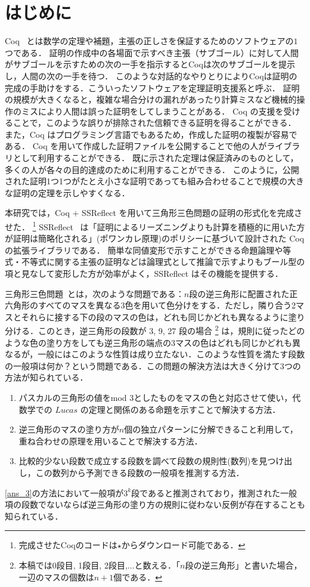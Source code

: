 \section{はじめに}
Coq~\cite{Coq} とは数学の定理や補題，主張の正しさを保証するためのソフトウェアの$1$つである．
証明の作成中の各場面で示すべき主張（サブゴール）に対して人間がサブゴールを示すための次の一手を指示するとCoqは次のサブゴールを提示し，人間の次の一手を待つ．
このような対話的なやりとりによりCoqは証明の完成の手助けをする．こういったソフトウェアを定理証明支援系と呼ぶ．
証明の規模が大きくなると，複雑な場合分けの漏れがあったり計算ミスなど機械的操作のミスにより人間は誤った証明をしてしまうことがある．
Coq の支援を受けることで，このような誤りが排除された信頼できる証明を得ることができる．
また，Coq はプログラミング言語でもあるため，作成した証明の複製が容易である．
Coq を用いて作成した証明ファイルを公開することで他の人がライブラリとして利用することができる．
既に示された定理は保証済みのものとして，多くの人が各々の目的達成のために利用することができる．
このように，公開された証明1つ1つがたとえ小さな証明であっても組み合わせることで規模の大きな証明の定理を示しやすくなる．

本研究では，Coq + SSReflect を用いて三角形三色問題の証明の形式化を完成させた．
\footnote{
  完成させたCoqのコードは$\star$からダウンロード可能である．
}
SSReflect~\cite{SSReflect,CoqBook} は「証明によるリーズニングよりも計算を積極的に用いた方が証明は簡略化される」(ポワンカレ原理)のポリシーに基づいて設計された Coq の拡張ライブラリである．
簡単な同値変形で示すことができる命題論理や等式・不等式に関する主張の証明などは論理式として推論で示すよりもブール型の項と見なして変形した方が効率がよく，SSReflect はその機能を提供する．

三角形三色問題~\cite{Nishiyama1,Nishiyama2,Nishiyama3}とは，次のような問題である：$n$段の逆三角形に配置された正六角形のすべてのマスを異なる3色を用いて色分けをする．ただし，隣り合う2マスとそれらに接する下の段のマスの色は，どれも同じかどれも異なるように塗り分ける．このとき，逆三角形の段数が 3, 9, 27 段の場合 \footnote{本稿では0段目, 1段目, 2段目,$\ldots$と数える．「$n$段の逆三角形」と書いた場合，一辺のマスの個数は$n+1$個である．} は，規則に従ったどのような色の塗り方をしても逆三角形の端点の3マスの色はどれも同じかどれも異なるが，一般にはこのような性質は成り立たない．このような性質を満たす段数の一般項は何か？という問題である．この問題の解決方法は大きく分けて3つの方法が知られている．\cite{Nishiyama1}
\begin{enumerate}
\item \label{ans_1}
  パスカルの三角形の値をmod $3$としたものをマスの色と対応させて使い，代数学での $Lucas$ の定理と関係のある命題を示すことで解決する方法．
\item \label{ans_2}
  逆三角形のマスの塗り方が$n$個の独立パターンに分解できること利用して，重ね合わせの原理を用いることで解決する方法．
\item \label{ans_3}
  比較的少ない段数で成立する段数を調べて段数の規則性(数列)を見つけ出し，この数列から予測できる段数の一般項を推測する方法．
\end{enumerate}
\ref{ans_3}の方法において一般項が$3^k$段であると推測されており，推測された一般項の段数でないならば逆三角形の塗り方の規則に従わない反例が存在することも知られている．

